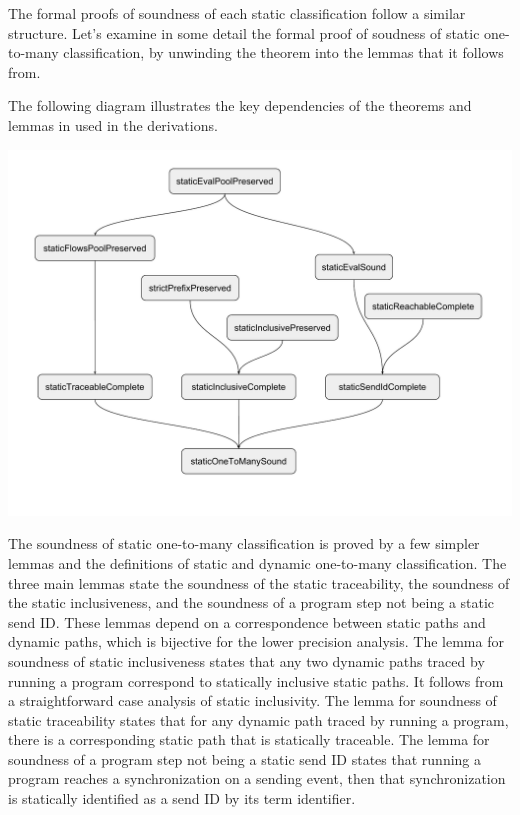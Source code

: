 \documentclass[10pt]{article}
\begin{document}
The formal proofs of soundness of each static classification follow a similar structure.
Let's examine in some detail the formal proof of soudness of static one-to-many classification,
by unwinding the theorem into the lemmas that it follows from.

The following diagram illustrates the key dependencies of the theorems and lemmas in
used in the derivations.

\includegraphics[width=1\textwidth]{cml-proof-low.pdf}

The soundness of static one-to-many classification is proved by a few simpler lemmas and the
definitions of static and dynamic one-to-many classification.  The three main lemmas state the
soundness of the static traceability, the soundness of the static inclusiveness, and
the soundness of a program step not being a static send ID. These lemmas depend on a
correspondence between static paths and dynamic paths, which is bijective for the lower
precision analysis. The lemma for soundness of static inclusiveness states that any two
dynamic paths traced by running a program correspond to statically inclusive static paths. It
follows from a straightforward case analysis of static inclusivity. The lemma for soundness of
static traceability states that for any dynamic path traced by running a program, there
is a corresponding static path that is statically traceable. The lemma for soundness of a
program step not being a static send ID states that running a program reaches a
synchronization on a sending event, then that synchronization is statically identified as a
send ID by its term identifier.
\end{document}
